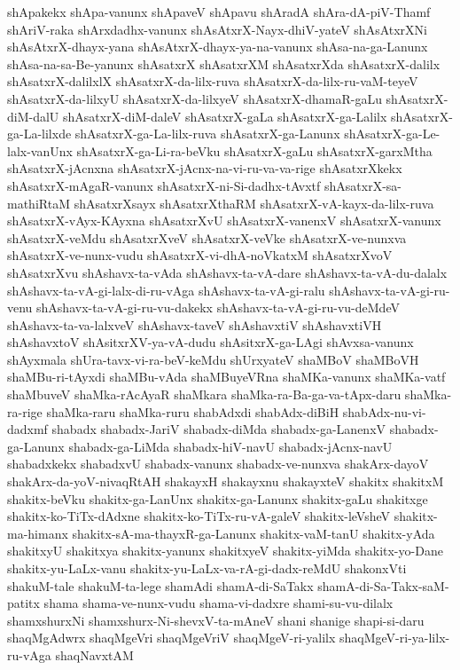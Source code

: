 {shApakekx
shApa-vanunx
shApaveV
shApavu
shAradA
shAra-dA-piV-Thamf
shAriV-raka
shArxdadhx-vanunx
shAsAtxrX-Nayx-dhiV-yateV
shAsAtxrXNi
shAsAtxrX-dhayx-yana
shAsAtxrX-dhayx-ya-na-vanunx
shAsa-na-ga-Lanunx
shAsa-na-sa-Be-yanunx
shAsatxrX
shAsatxrXM
shAsatxrXda
shAsatxrX-dalilx
shAsatxrX-dalilxlX
shAsatxrX-da-lilx-ruva
shAsatxrX-da-lilx-ru-vaM-teyeV
shAsatxrX-da-lilxyU
shAsatxrX-da-lilxyeV
shAsatxrX-dhamaR-gaLu
shAsatxrX-diM-dalU
shAsatxrX-diM-daleV
shAsatxrX-gaLa
shAsatxrX-ga-Lalilx
shAsatxrX-ga-La-lilxde
shAsatxrX-ga-La-lilx-ruva
shAsatxrX-ga-Lanunx
shAsatxrX-ga-Le-lalx-vanUnx
shAsatxrX-ga-Li-ra-beVku
shAsatxrX-gaLu
shAsatxrX-garxMtha
shAsatxrX-jAcnxna
shAsatxrX-jAcnx-na-vi-ru-va-va-rige
shAsatxrXkekx
shAsatxrX-mAgaR-vanunx
shAsatxrX-ni-Si-dadhx-tAvxtf
shAsatxrX-sa-mathiRtaM
shAsatxrXsayx
shAsatxrXthaRM
shAsatxrX-vA-kayx-da-lilx-ruva
shAsatxrX-vAyx-KAyxna
shAsatxrXvU
shAsatxrX-vanenxV
shAsatxrX-vanunx
shAsatxrX-veMdu
shAsatxrXveV
shAsatxrX-veVke
shAsatxrX-ve-nunxva
shAsatxrX-ve-nunx-vudu
shAsatxrX-vi-dhA-noVkatxM
shAsatxrXvoV
shAsatxrXvu
shAshavx-ta-vAda
shAshavx-ta-vA-dare
shAshavx-ta-vA-du-dalalx
shAshavx-ta-vA-gi-lalx-di-ru-vAga
shAshavx-ta-vA-gi-ralu
shAshavx-ta-vA-gi-ru-venu
shAshavx-ta-vA-gi-ru-vu-dakekx
shAshavx-ta-vA-gi-ru-vu-deMdeV
shAshavx-ta-va-lalxveV
shAshavx-taveV
shAshavxtiV
shAshavxtiVH
shAshavxtoV
shAsitxrXV-ya-vA-dudu
shAsitxrX-ga-LAgi
shAvxsa-vanunx
shAyxmala
shUra-tavx-vi-ra-beV-keMdu
shUrxyateV
shaMBoV
shaMBoVH
shaMBu-ri-tAyxdi
shaMBu-vAda
shaMBuyeVRna
shaMKa-vanunx
shaMKa-vatf
shaMbuveV
shaMka-rAcAyaR
shaMkara
shaMka-ra-Ba-ga-va-tApx-daru
shaMka-ra-rige
shaMka-raru
shaMka-ruru
shabAdxdi
shabAdx-diBiH
shabAdx-nu-vi-dadxmf
shabadx
shabadx-JariV
shabadx-diMda
shabadx-ga-LanenxV
shabadx-ga-Lanunx
shabadx-ga-LiMda
shabadx-hiV-navU
shabadx-jAcnx-navU
shabadxkekx
shabadxvU
shabadx-vanunx
shabadx-ve-nunxva
shakArx-dayoV
shakArx-da-yoV-nivaqRtAH
shakayxH
shakayxnu
shakayxteV
shakitx
shakitxM
shakitx-beVku
shakitx-ga-LanUnx
shakitx-ga-Lanunx
shakitx-gaLu
shakitxge
shakitx-ko-TiTx-dAdxne
shakitx-ko-TiTx-ru-vA-galeV
shakitx-leVsheV
shakitx-ma-himanx
shakitx-sA-ma-thayxR-ga-Lanunx
shakitx-vaM-tanU
shakitx-yAda
shakitxyU
shakitxya
shakitx-yanunx
shakitxyeV
shakitx-yiMda
shakitx-yo-Dane
shakitx-yu-LaLx-vanu
shakitx-yu-LaLx-va-rA-gi-dadx-reMdU
shakonxVti
shakuM-tale
shakuM-ta-lege
shamAdi
shamA-di-SaTakx
shamA-di-Sa-Takx-saM-patitx
shama
shama-ve-nunx-vudu
shama-vi-dadxre
shami-su-vu-dilalx
shamxshurxNi
shamxshurx-Ni-shevxV-ta-mAneV
shani
shanige
shapi-si-daru
shaqMgAdwrx
shaqMgeVri
shaqMgeVriV
shaqMgeV-ri-yalilx
shaqMgeV-ri-ya-lilx-ru-vAga
shaqNavxtAM
}
